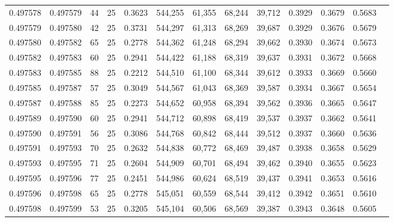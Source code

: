 \begin{tabular}{rrrrrrrrrrrrr}
0.497578 & 0.497579 &    44 &  25 &                                     0.3623 & 544,255 &  61,355 &  68,244 &  39,712 & 0.3929 & 0.3679 & 0.5683 \\
0.497579 & 0.497580 &    42 &  25 &                                     0.3731 & 544,297 &  61,313 &  68,269 &  39,687 & 0.3929 & 0.3676 & 0.5679 \\
0.497580 & 0.497582 &    65 &  25 &                                     0.2778 & 544,362 &  61,248 &  68,294 &  39,662 & 0.3930 & 0.3674 & 0.5673 \\
0.497582 & 0.497583 &    60 &  25 &                                     0.2941 & 544,422 &  61,188 &  68,319 &  39,637 & 0.3931 & 0.3672 & 0.5668 \\
0.497583 & 0.497585 &    88 &  25 &                                     0.2212 & 544,510 &  61,100 &  68,344 &  39,612 & 0.3933 & 0.3669 & 0.5660 \\
0.497585 & 0.497587 &    57 &  25 &                                     0.3049 & 544,567 &  61,043 &  68,369 &  39,587 & 0.3934 & 0.3667 & 0.5654 \\
0.497587 & 0.497588 &    85 &  25 &                                     0.2273 & 544,652 &  60,958 &  68,394 &  39,562 & 0.3936 & 0.3665 & 0.5647 \\
0.497589 & 0.497590 &    60 &  25 &                                     0.2941 & 544,712 &  60,898 &  68,419 &  39,537 & 0.3937 & 0.3662 & 0.5641 \\
0.497590 & 0.497591 &    56 &  25 &                                     0.3086 & 544,768 &  60,842 &  68,444 &  39,512 & 0.3937 & 0.3660 & 0.5636 \\
0.497591 & 0.497593 &    70 &  25 &                                     0.2632 & 544,838 &  60,772 &  68,469 &  39,487 & 0.3938 & 0.3658 & 0.5629 \\
0.497593 & 0.497595 &    71 &  25 &                                     0.2604 & 544,909 &  60,701 &  68,494 &  39,462 & 0.3940 & 0.3655 & 0.5623 \\
0.497595 & 0.497596 &    77 &  25 &                                     0.2451 & 544,986 &  60,624 &  68,519 &  39,437 & 0.3941 & 0.3653 & 0.5616 \\
0.497596 & 0.497598 &    65 &  25 &                                     0.2778 & 545,051 &  60,559 &  68,544 &  39,412 & 0.3942 & 0.3651 & 0.5610 \\
0.497598 & 0.497599 &    53 &  25 &                                     0.3205 & 545,104 &  60,506 &  68,569 &  39,387 & 0.3943 & 0.3648 & 0.5605 \\

\end{tabular}
